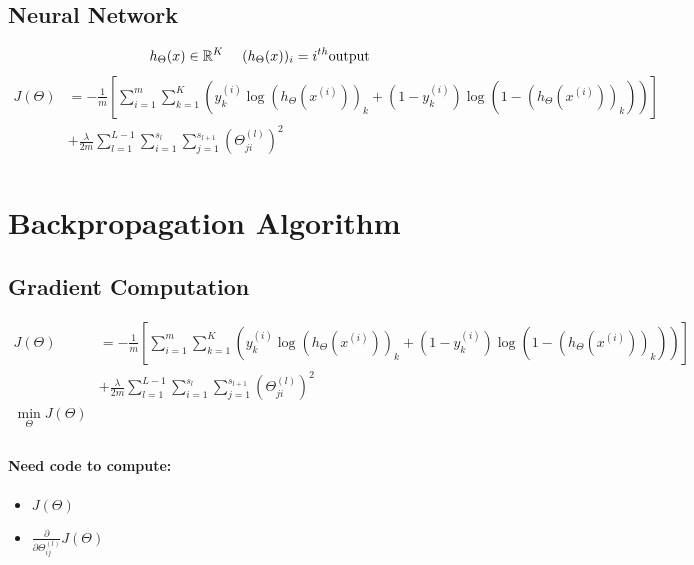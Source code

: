 \subsection*{Neural Network}
\begin{equation*}
	h_\Theta(x) \in \R^K \ \ \ \ (h_\Theta(x))_i = i^{th} \text{output}
\end{equation*}
\begin{align*}
	J(\Theta) & = -\frac{1}{m}\left[
	\sum_{i=1}^m \sum_{k=1}^K \left(
	y_k^{(i)}\log\left(
	h_\Theta(x^{(i)})
	\right)_k + \left(
	1 - y_k^{(i)}
	\right)\log\left(
	1 - \left(
		h_\Theta(x^{(i)})
		\right)_k
	\right)
	\right)
	\right]                          \\
	          & + \frac{\lambda}{2m}
	\sum_{l=1}^{L-1}\sum_{i=1}^{s_l}\sum_{j=1}^{s_{l+1}}\left(
	\Theta_{ji}^{(l)}
	\right)^2                        \\
\end{align*}

\section{Backpropagation Algorithm}
\subsection{Gradient Computation}
\begin{align*}
	J(\Theta) & = -\frac{1}{m}\left[
	\sum_{i=1}^m \sum_{k=1}^K \left(
	y_k^{(i)}\log\left(
	h_\Theta(x^{(i)})
	\right)_k + \left(
	1 - y_k^{(i)}
	\right)\log\left(
	1 - \left(
		h_\Theta(x^{(i)})
		\right)_k
	\right)
	\right)
	\right]                          \\
	          & + \frac{\lambda}{2m}
	\sum_{l=1}^{L-1}\sum_{i=1}^{s_l}\sum_{j=1}^{s_{l+1}}\left(
	\Theta_{ji}^{(l)}
	\right)^2                        \\
	\min_\Theta J(\Theta)            \\
\end{align*}

\paragraph{Need code to compute:}
\begin{itemize}
	\item $J(\Theta)$
	\item $\frac{\partial}{\partial\Theta_{ij}^{(l)}}J(\Theta)$
\end{itemize}

